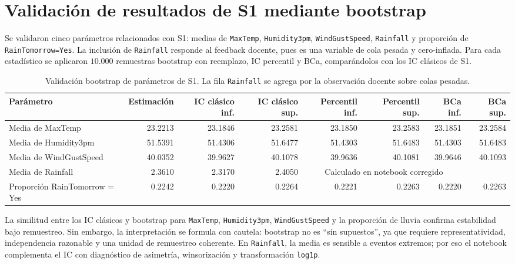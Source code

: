 \documentclass[10pt,a4paper]{article}
\begin{document}
\section{Validación de resultados de S1 mediante bootstrap}

Se validaron cinco parámetros relacionados con S1: medias de \texttt{MaxTemp}, \texttt{Humidity3pm}, \texttt{WindGustSpeed}, \texttt{Rainfall} y proporción de \texttt{RainTomorrow=Yes}. La inclusión de \texttt{Rainfall} responde al feedback docente, pues es una variable de cola pesada y cero-inflada. Para cada estadístico se aplicaron $10.000$ remuestras bootstrap con reemplazo, IC percentil y BCa, comparándolos con los IC clásicos de S1.

\begin{table}[H]
\centering\scriptsize
\begin{adjustbox}{max width=\textwidth}
\begin{tabular}{lrrrrrrr}
\toprule
Parámetro & Estimación & IC clásico inf. & IC clásico sup. & Percentil inf. & Percentil sup. & BCa inf. & BCa sup. \\
\midrule
Media de MaxTemp & 23.2213 & 23.1846 & 23.2581 & 23.1850 & 23.2583 & 23.1851 & 23.2584 \\
Media de Humidity3pm & 51.5391 & 51.4306 & 51.6477 & 51.4303 & 51.6483 & 51.4303 & 51.6483 \\
Media de WindGustSpeed & 40.0352 & 39.9627 & 40.1078 & 39.9636 & 40.1081 & 39.9646 & 40.1093 \\
Media de Rainfall & 2.3610 & 2.3170 & 2.4050 & \multicolumn{3}{c}{Calculado en notebook corregido} \\
Proporción RainTomorrow = Yes & 0.2242 & 0.2220 & 0.2264 & 0.2221 & 0.2263 & 0.2220 & 0.2263 \\
\bottomrule
\end{tabular}
\end{adjustbox}
\caption{Validación bootstrap de parámetros de S1. La fila \texttt{Rainfall} se agrega por la observación docente sobre colas pesadas.}
\end{table}

La similitud entre los IC clásicos y bootstrap para \texttt{MaxTemp}, \texttt{Humidity3pm}, \texttt{WindGustSpeed} y la proporción de lluvia confirma estabilidad bajo remuestreo. Sin embargo, la interpretación se formula con cautela: bootstrap no es ``sin supuestos'', ya que requiere representatividad, independencia razonable y una unidad de remuestreo coherente. En \texttt{Rainfall}, la media es sensible a eventos extremos; por eso el notebook complementa el IC con diagnóstico de asimetría, winsorización y transformación \texttt{log1p}.
\end{document}
